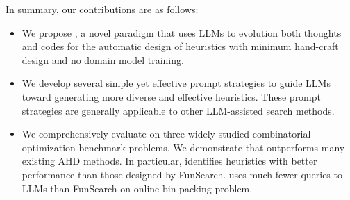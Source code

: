 %
In summary, our contributions are as follows:
\begin{itemize}
    \item We propose \ourmethod{}, a novel paradigm that uses LLMs to evolution both thoughts and codes for the automatic design of heuristics with minimum hand-craft design and no domain model training.
    \item We develop several simple yet effective prompt strategies to guide LLMs toward generating more diverse and effective heuristics. These prompt strategies are generally applicable to other LLM-assisted search methods.  
    \item We comprehensively evaluate \ourmethod{} on three widely-studied combinatorial optimization benchmark problems.  We demonstrate that \ourmethod{} outperforms many existing AHD methods. In particular, \ourmethod{} identifies heuristics with better performance than those designed by FunSearch. \ourmethod{} uses much fewer queries to LLMs than FunSearch on online bin packing problem.

\end{itemize}
\vspace{1pt}


